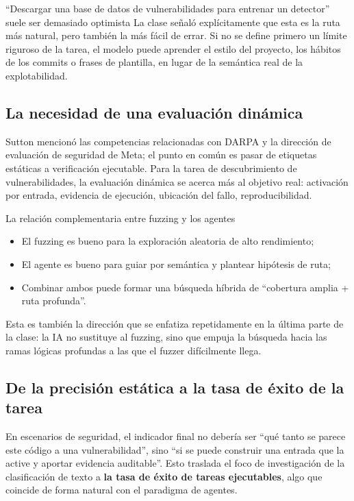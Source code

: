 \begin{warningbox}{``Descargar una base de datos de vulnerabilidades para entrenar un detector'' suele ser demasiado optimista}
La clase señaló explícitamente que esta es la ruta más natural, pero también la más fácil de errar. Si no se define primero un límite riguroso de la tarea, el modelo puede aprender el estilo del proyecto, los hábitos de los commits o frases de plantilla, en lugar de la semántica real de la explotabilidad.
\end{warningbox}

\subsection{La necesidad de una evaluación dinámica}
Sutton mencionó las competencias relacionadas con DARPA y la dirección de evaluación de seguridad de Meta; el punto en común es pasar de etiquetas estáticas a verificación ejecutable. Para la tarea de descubrimiento de vulnerabilidades, la evaluación dinámica se acerca más al objetivo real: activación por entrada, evidencia de ejecución, ubicación del fallo, reproducibilidad.

\begin{knowledgebox}{La relación complementaria entre fuzzing y los agentes}
\begin{itemize}
    \item El fuzzing es bueno para la exploración aleatoria de alto rendimiento;
    \item El agente es bueno para guiar por semántica y plantear hipótesis de ruta;
    \item Combinar ambos puede formar una búsqueda híbrida de ``cobertura amplia + ruta profunda''.
\end{itemize}
Esta es también la dirección que se enfatiza repetidamente en la última parte de la clase: la IA no sustituye al fuzzing, sino que empuja la búsqueda hacia las ramas lógicas profundas a las que el fuzzer difícilmente llega.
\end{knowledgebox}

\subsection{De la precisión estática a la tasa de éxito de la tarea}
En escenarios de seguridad, el indicador final no debería ser ``qué tanto se parece este código a una vulnerabilidad'', sino ``si se puede construir una entrada que la active y aportar evidencia auditable''. Esto traslada el foco de investigación de la clasificación de texto a \textbf{la tasa de éxito de tareas ejecutables}, algo que coincide de forma natural con el paradigma de agentes.

